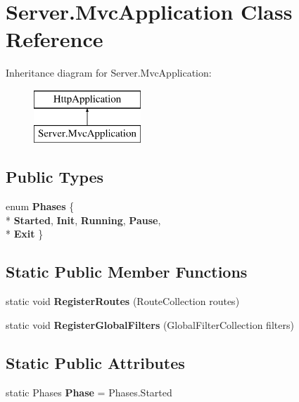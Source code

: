 \hypertarget{classServer_1_1MvcApplication}{\section{Server.\-Mvc\-Application Class Reference}
\label{classServer_1_1MvcApplication}
}
Inheritance diagram for Server.\-Mvc\-Application\-:\begin{figure}[H]
\begin{center}
\leavevmode
\includegraphics[height=2.000000cm]{classServer_1_1MvcApplication}
\end{center}
\end{figure}
\subsection*{Public Types}
\begin{DoxyCompactItemize}
\item 
enum {\bfseries Phases} \{ \\*
{\bfseries Started}, 
{\bfseries Init}, 
{\bfseries Running}, 
{\bfseries Pause}, 
\\*
{\bfseries Exit}
 \}
\end{DoxyCompactItemize}
\subsection*{Static Public Member Functions}
\begin{DoxyCompactItemize}
\item 
\hypertarget{classServer_1_1MvcApplication_a50dcfe940ddd423bded4a7e913ab9ccd}{static void {\bfseries Register\-Routes} (Route\-Collection routes)}\label{classServer_1_1MvcApplication_a50dcfe940ddd423bded4a7e913ab9ccd}

\item 
\hypertarget{classServer_1_1MvcApplication_ac65595dcc87fd3cebd1627e7f04ba04b}{static void {\bfseries Register\-Global\-Filters} (Global\-Filter\-Collection filters)}\label{classServer_1_1MvcApplication_ac65595dcc87fd3cebd1627e7f04ba04b}

\end{DoxyCompactItemize}
\subsection*{Static Public Attributes}
\begin{DoxyCompactItemize}
\item 
\hypertarget{classServer_1_1MvcApplication_aee00f1100bfc8ac1947093abe4d96f4c}{static Phases {\bfseries Phase} = Phases.\-Started}\label{classServer_1_1MvcApplication_aee00f1100bfc8ac1947093abe4d96f4c}

\end{DoxyCompactItemize}
